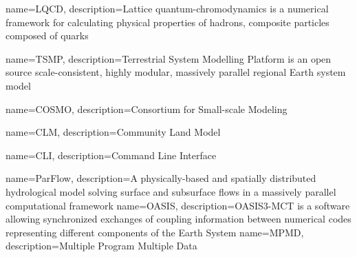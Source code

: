 









{
    name=LQCD,
    description={Lattice quantum-chromodynamics is a numerical framework for calculating physical properties of hadrons, composite particles composed of quarks}
}

{
    name=TSMP,
    description={Terrestrial System Modelling Platform is an open source scale-consistent, highly modular, massively parallel regional Earth system model}
}

{
    name=COSMO,
    description={Consortium for Small-scale Modeling}
}

{
    name=CLM,
    description={Community Land Model}
}

{
    name=CLI,
    description={Command Line Interface}
}

{
    name=ParFlow,
    description={A physically-based and spatially distributed hydrological model solving surface and subsurface flows in a massively parallel computational framework}
}
{
    name=OASIS,
    description={OASIS3-MCT is a software allowing synchronized exchanges of coupling information between numerical codes representing different components of the Earth System}
}
{
    name=MPMD,
    description={Multiple Program Multiple Data}
}

